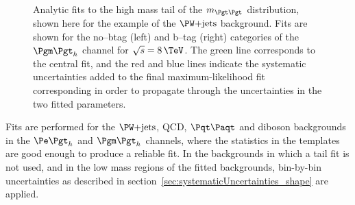 \begin{figure}[tbh]
\caption[Analytic fits to the high mass tail of the $m_{\Pgt\Pgt}$ distribution,
shown for the example of the $\WJets$ background.]{Analytic fits to the high mass tail of the $m_{\Pgt\Pgt}$ distribution,
shown here for the example of the $\WJets$ background. Fits are shown for the
no--btag (left) and b--tag (right) categories of the $\mutau$ channel for
$\sqrt{s}=8\,\TeV$. The green line corresponds to the central fit, and the red and blue
lines indicate the systematic uncertainties added to the final
maximum-likelihood fit corresponding in order to propagate through the
uncertainties in the two fitted parameters.}
\label{fig:tailfits}
\end{figure}

Fits are performed for the $\WJets$, QCD, $\ttbar$ and diboson backgrounds in the $\etau$
and $\mutau$ channels, where the statistics in the templates are good enough to
produce a reliable fit. In the backgrounds in which a tail fit is not used, and
in the low mass regions of the fitted backgrounds, bin-by-bin uncertainties as
described in section~\ref{sec:systematicUncertainties_shape} are applied.

